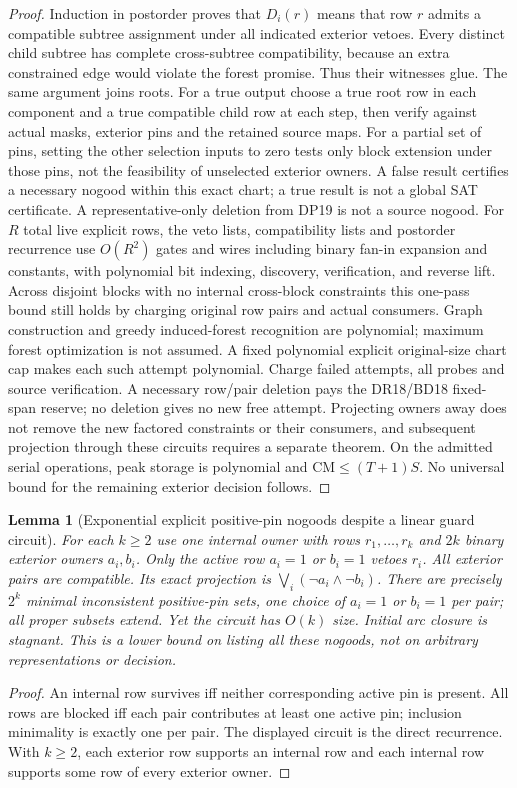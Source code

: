 \documentclass[11pt]{article}
\newtheorem{lemma}[theorem]{Lemma}
\begin{document}
\begin{proof}
Induction in postorder proves that $D_i(r)$ means that row $r$ admits a compatible subtree assignment under all indicated exterior vetoes. Every distinct child subtree has complete cross-subtree compatibility, because an extra constrained edge would violate the forest promise. Thus their witnesses glue. The same argument joins roots. For a true output choose a true root row in each component and a true compatible child row at each step, then verify against actual masks, exterior pins and the retained source maps. For a partial set of pins, setting the other selection inputs to zero tests only block extension under those pins, not the feasibility of unselected exterior owners. A false result certifies a necessary nogood within this exact chart; a true result is not a global SAT certificate. A representative-only deletion from DP19 is not a source nogood.
For $R$ total live explicit rows, the veto lists, compatibility lists and postorder recurrence use $O(R^2)$ gates and wires including binary fan-in expansion and constants, with polynomial bit indexing, discovery, verification, and reverse lift. Across disjoint blocks with no internal cross-block constraints this one-pass bound still holds by charging original row pairs and actual consumers. Graph construction and greedy induced-forest recognition are polynomial; maximum forest optimization is not assumed. A fixed polynomial explicit original-size chart cap makes each such attempt polynomial. Charge failed attempts, all probes and source verification. A necessary row/pair deletion pays the DR18/BD18 fixed-span reserve; no deletion gives no new free attempt. Projecting owners away does not remove the new factored constraints or their consumers, and subsequent projection through these circuits requires a separate theorem. On the admitted serial operations, peak storage is polynomial and $\mathrm{CM}\le(T+1)S$. No universal bound for the remaining exterior decision follows.
\end{proof}

\begin{lemma}[Exponential explicit positive-pin nogoods despite a linear guard circuit]\label{lem:bd19-nogoods}
For each $k\ge2$ use one internal owner with rows $r_1,\ldots,r_k$ and $2k$ binary exterior owners $a_i,b_i$. Only the active row $a_i=1$ or $b_i=1$ vetoes $r_i$. All exterior pairs are compatible. Its exact projection is $\bigvee_i(\neg a_i\land\neg b_i)$. There are precisely $2^k$ minimal inconsistent positive-pin sets, one choice of $a_i=1$ or $b_i=1$ per pair; all proper subsets extend. Yet the circuit has $O(k)$ size. Initial arc closure is stagnant. This is a lower bound on listing all these nogoods, not on arbitrary representations or decision.
\end{lemma}
\begin{proof}
An internal row survives iff neither corresponding active pin is present. All rows are blocked iff each pair contributes at least one active pin; inclusion minimality is exactly one per pair. The displayed circuit is the direct recurrence. With $k\ge2$, each exterior row supports an internal row and each internal row supports some row of every exterior owner.
\end{proof}
\end{document}
